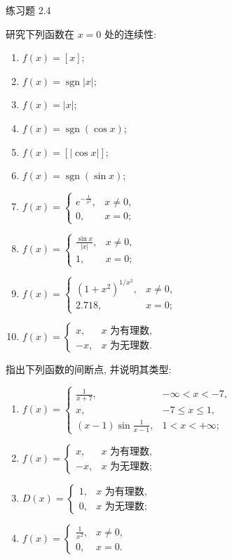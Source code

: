 \begin{exblock}{练习题 2.4}
\item 研究下列函数在 $x = 0$ 处的连续性:
  \begin{enumerate}[label=(\arabic*)]
    \item $f(x) = [x]$;
    \item $f(x) = \operatorname{sgn}|x|$;
    \item $f(x) = |x|$;
    \item $f(x) = \operatorname{sgn}(\cos x)$;
    \item $f(x) = [|\cos x|]$;
    \item $f(x) = \operatorname{sgn}(\sin x)$;
    \item $f(x) = \begin{cases} e^{-\frac{1}{x^2}}, & x \neq 0, \\ 0, & x = 0; \end{cases}$
    \item $f(x) = \begin{cases} \frac{\sin x}{|x|}, & x \neq 0, \\ 1, & x = 0; \end{cases}$
    \item $f(x) = \begin{cases} (1 + x^2)^{1/x^2}, & x \neq 0, \\ 2.718, & x = 0; \end{cases}$
    \item $f(x) = \begin{cases} x, & x \text{ 为有理数}, \\ -x, & x \text{ 为无理数}. \end{cases}$
  \end{enumerate}

\item 指出下列函数的间断点, 并说明其类型:
  \begin{enumerate}[label=(\arabic*)]
    \item $f(x) = \begin{cases} \frac{1}{x + 7}, & -\infty < x < -7, \\ x, & -7 \leqslant x \leqslant 1, \\ (x - 1)\sin\frac{1}{x - 1}, & 1 < x < +\infty; \end{cases}$
    \item $f(x) = \begin{cases} x, & x \text{ 为有理数}, \\ -x, & x \text{ 为无理数}; \end{cases}$
    \item $D(x) = \begin{cases} 1, & x \text{ 为有理数}, \\ 0, & x \text{ 为无理数}; \end{cases}$
    \item $f(x) = \begin{cases} \frac{1}{x^2}, & x \neq 0, \\ 0, & x = 0. \end{cases}$
  \end{enumerate}


\end{exblock}
